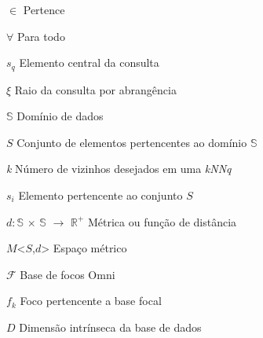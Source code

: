 
\begin{simbolos}
    \item[$ \in $] Pertence
    \item [$\forall$] Para todo
    \item[$s_q$] Elemento central da consulta
    \item[$\xi$] Raio da consulta por abrangência
    \item [$\mathbb{S}$] Domínio de dados
    \item [$S$] Conjunto de elementos pertencentes ao domínio $\mathbb{S}$
    \item [\textit{k}] Número de vizinhos desejados em uma \textit{kNNq}
    \item [$s_i$] Elemento pertencente ao conjunto $S$
    \item [$d:\mathbb{S}$ $\times$ $\mathbb{S}$ $\rightarrow$ $\mathbb{R^{+}}$] Métrica ou função de distância
    \item[$M$<$S$,$d$>] Espaço métrico
    \item [$\mathscr{F}$] Base de focos Omni
    \item [$f_k$] Foco pertencente a base focal
    \item [$D$] Dimensão intrínseca da base de dados
\end{simbolos}


